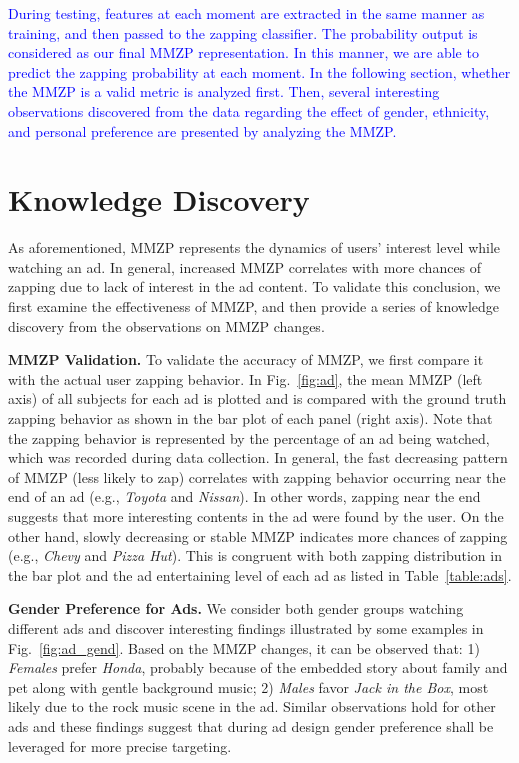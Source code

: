 \documentclass[twoside,leqno,twocolumn]{article}
\newcommand{\SFAdd}[1]{\textcolor{blue}{#1}}
\begin{document}
\SFAdd{During testing, features at each moment are extracted in the same manner as training, and then passed to the zapping classifier. The probability output is considered as our final MMZP representation. In this manner, we are able to predict the zapping probability at each moment. In the following section, whether the MMZP is a valid metric is analyzed first. Then, several interesting observations discovered from the data regarding the effect of gender, ethnicity, and personal preference are presented by analyzing the MMZP.}


\section{Knowledge Discovery}

As aforementioned, MMZP represents the dynamics of users' interest level while watching an ad. In general, increased MMZP correlates with more chances of zapping due to lack of interest in the ad content. To validate this conclusion, we first examine the effectiveness of MMZP, and then provide a series of knowledge discovery from the observations on MMZP changes. 



\noindent \textbf{MMZP Validation.} To validate the accuracy of MMZP, we first compare it with the actual user zapping behavior. In Fig.~\ref{fig:ad}, the mean MMZP (left axis) of all subjects for each ad is plotted and is compared with the ground truth zapping behavior as shown in the bar plot of each panel (right axis). Note that the zapping behavior is represented by the percentage of an ad being watched, which was recorded during data collection. In general, the fast decreasing pattern of MMZP (less likely to zap) correlates with zapping behavior occurring near the end of an ad (e.g., \textit{Toyota} and \textit{Nissan}). In other words, zapping near the end suggests that more interesting contents in the ad were found by the user. On the other hand, slowly decreasing or stable MMZP indicates more chances of zapping (e.g., \textit{Chevy} and \textit{Pizza Hut}). This is congruent with both zapping distribution in the bar plot and the ad entertaining level of each ad as listed in Table~\ref{table:ads}. 

\noindent \textbf{Gender Preference for Ads.} We consider both gender groups watching different ads and discover interesting findings illustrated by some examples in Fig.~\ref{fig:ad_gend}. Based on the MMZP changes, it can be observed that: 1) \textit{Females} prefer \textit{Honda}, probably because of the embedded story about family and pet along with gentle background music; 2) \textit{Males} favor \textit{Jack in the Box}, most likely due to the rock music scene in the ad. Similar observations hold for other ads and these findings suggest that during ad design gender preference shall be leveraged for more precise targeting. 
\end{document}
